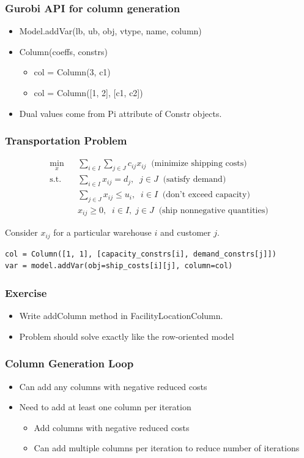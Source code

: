 \documentclass[12pt,handout]{beamer}
\begin{document}
\begin{frame}
\frametitle{Gurobi API for column generation}
\begin{itemize}
\item Model.addVar(lb, ub, obj, vtype, name, column)
\item Column(coeffs, constrs)
     \begin{itemize}
     \item col = Column(3, c1)
     \item col = Column([1, 2], [c1, c2])
     \end{itemize}
\item Dual values come from Pi attribute of Constr objects.
\end{itemize}
\end{frame}

\begin{frame}[containsverbatim]
\frametitle{Transportation Problem}
\begin{eqnarray}
\min_{x} && \sum_{i \in I} \sum_{j \in J} c_{ij} x_{ij} \;\; \mbox{(minimize shipping costs)} \nonumber \\
\mbox{s.t.} && \sum_{i \in I} x_{ij} = d_j,\;\;j \in J \;\; \mbox{(satisfy demand)}\nonumber \\
&& \sum_{j \in J} x_{ij} \le u_i,\;\;i \in I \;\; \mbox{(don't exceed capacity)} \nonumber \\
&& x_{ij} \ge 0, \;\;i \in I,\;j \in J \;\; \mbox{(ship nonnegative quantities)} \nonumber
\end{eqnarray}

Consider $x_{ij}$ for a particular warehouse $i$ and customer $j$.

{\scriptsize
\begin{verbatim} 
col = Column([1, 1], [capacity_constrs[i], demand_constrs[j]])
var = model.addVar(obj=ship_costs[i][j], column=col)
\end{verbatim}
}
\end{frame}

\begin{frame}
  \frametitle{Exercise}
  \begin{itemize}
    \item Write addColumn method in FacilityLocationColumn.
    \item Problem should solve exactly like the row-oriented model
  \end{itemize}
\end{frame}

\begin{frame}
  \frametitle{Column Generation Loop}
  \begin{itemize}
  \item Can add any columns with negative reduced costs
  \item Need to add at least one column per iteration
    \begin{itemize}
    \item Add columns with negative reduced costs
    \item Can add multiple columns per iteration to reduce number of iterations
    \end{itemize}
  \end{itemize}
\end{frame}
\end{document}

